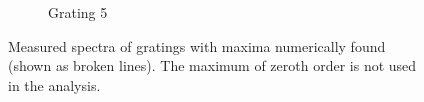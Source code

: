 \begin{figure}
\begin{subfigure}[b]{\mpltw}
        \caption{Grating 5}
        \label{fig:gratings_maxi1}
    \end{subfigure}
    \caption{
        Measured spectra of gratings with maxima numerically found (shown as broken 
            lines). The maximum of zeroth order is not used in the analysis. 
        }
    \label{fig:gratings_maxima}
\end{figure}
